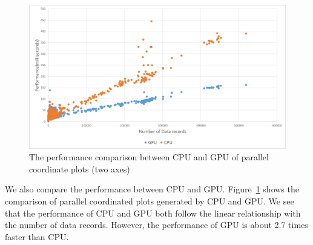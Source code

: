 \begin{figure}[htb]
	\centering
	\includegraphics[width=0.75\linewidth]{pic/cmp.png}
	\parbox[t]{1.0\columnwidth}{\relax
	}
	\caption{\label{fig:cmp} The performance comparison between CPU and GPU of parallel coordinate plots (two axes) }
\end{figure}

We also compare the performance between CPU and GPU. Figure~\ref{fig:cmp} shows the comparison of parallel coordinated plots generated by CPU and GPU. We see that the performance of CPU and GPU both follow the linear relationship with the number of data records. However, the performance of GPU is about 2.7 times faster than CPU.
